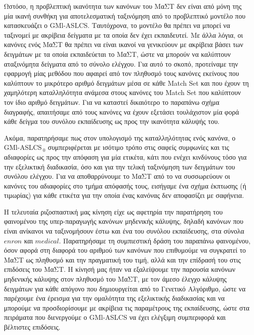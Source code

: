 Ωστόσο, η προβλεπτική ικανότητα των κανόνων του ΜαΣΤ δεν είναι από μόνη της μία ικανή συνθήκη για αποτελεσματική ταξινόμηση από το προβλεπτικό μοντέλο που κατασκευάζει ο GMl-ASLCS. Ταυτόχρονα, το μοντέλο θα πρέπει να μπορεί να ταξινομεί με ακρίβεια δείγματα με τα οποία δεν έχει εκπαιδευτεί. Με άλλα λόγια, οι κανόνες ενός ΜαΣΤ θα πρέπει να είναι ικανοί να γενικεύουν με ακρίβεια βάσει των δειγμάτων με τα οποία εκπαιδεύεται το ΜαΣΤ, ώστε να μπορούν να καλύπτουν αταξινόμητα δείγματα από το σύνολο ελέγχου. Για αυτό το σκοπό, προτείναμε την εφαρμογή μίας μεθόδου που αφαιρεί από τον πληθυσμό τους κανόνες εκείνους που καλύπτουν το μικρότερο αριθμό δειγμάτων μέσα σε κάθε Match Set και που έχουν τη χαμηλότερη καταλληλότητα ανάμεσα στους κανόνες του Match Set που καλύπτουν τον ίδιο αριθμό δειγμάτων. Για να καταστεί δικαιότερο το παραπάνω σχήμα διαγραφής, απαιτήσαμε από τους κανόνες να έχουν εξετάσει τουλάχιστον μία φορά κάθε δείγμα του συνόλου εκπαίδευσης ως προς την ικανότητα κάλυψής του.

Ακόμα, παρατηρήσαμε πως στον υπολογισμό της καταλληλότητας ενός κανόνα, ο GMl-ASLCS$_{\:0}$ συμπεριφέρεται με ισότιμο τρόπο στις σαφείς συμφωνίες και τις αδιαφορίες ως προς την απόφαση για μία ετικέτα, κάτι που ενέχει κινδύνους τόσο για την εξελικτική διαδικασία, όσο και για την τελική ταξινόμηση των δειγμάτων του συνόλου ελέγχου. Για να αποθαρρύνουμε το ΜαΣΤ από το να συσσωρεύουν οι κανόνες του αδιαφορίες στο τμήμα απόφασής τους, εισήγαμε ένα σχήμα έκπτωσης (ή τιμωρίας) για κάθε ετικέτα για την οποία ένας κανόνας δεν αποφασίζει με σαφήνεια.

Η τελευταία ριζοσπαστική μας κίνηση είχε ως αφετηρία την παρατήρηση του φαινομένου της υπερ-παραγωγής κανόνων μηδενικής κάλυψης, δηλαδή κανόνων που είναι ανίκανοι να ταξινομήσουν έστω και ένα του συνόλου εκπαίδευσης, στα σύνολα $enron$ και $medical$. Παρατηρήσαμε τη συμπιεστική δράση του παραπάνω φαινομένου, όσον αφορά στη διαφορά του αριθμού των κανόνων που επιθυμούμε να συγκρατεί το ΜαΣΤ ως πληθυσμό και την πραγματική του τιμή, αλλά και την επίδρασή του στις επιδόσεις του ΜαΣΤ. Η κίνησή μας ήταν να εξαλείψουμε την παρουσία κανόνων μηδενικής κάλυψης στον πληθυσμό του ΜαΣΤ, με τον άμεσο έλεγχο κάλυψης δειγμάτων για κάθε απόγονο που δημιουργείται από το Γενετικό Αλγόριθμο, ώστε να παρέχουμε ένα έρεισμα για την ομαλότητα της εξελικτικής διαδικασίας και να μπορούμε να προσδιορίσουμε με ακρίβεια τις παραμέτρους της εκπαίδευσης, ώστε στα πειράματα που διενεργούμε ο GMl-ASLCS να έχει ελέγξιμη συμπεριφορά και βέλτιστες επιδόσεις.

